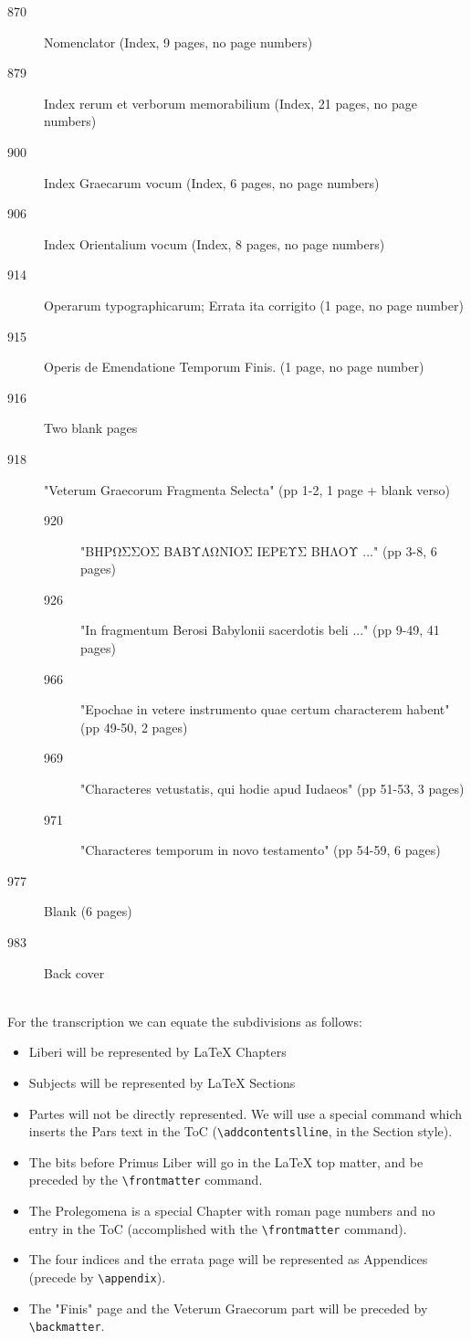 \documentclass{report}
\begin{document}
\begin{description}
\item[870] Nomenclator (Index,  9 pages, no page numbers)
\item[879] Index rerum et verborum memorabilium
 (Index, 21 pages, no page numbers)
\item[900] Index Graecarum vocum (Index, 6 pages, no page numbers)
\item[906] Index Orientalium vocum (Index,  8 pages, no page numbers)
\item[914] Operarum typographicarum; Errata ita corrigito
 (1 page, no page number)
\item[915] Operis de Emendatione Temporum Finis. (1 page, no page number)
\item[916] Two blank pages
\item[918] "Veterum Graecorum Fragmenta Selecta" (pp 1-2, 1 page + blank verso)
\begin{description}
  \item[920] "ΒΗΡΩΣΣΟΣ ΒΑΒΥΛΩΝΙΟΣ ΙΕΡΕΥΣ ΒΗΛΟΥ ..."
     (pp 3-8, 6 pages)
  \item[926] "In fragmentum Berosi Babylonii sacerdotis beli ..."
     (pp 9-49, 41 pages)
  \item[966] "Epochae in vetere instrumento quae certum characterem habent"
     (pp 49-50, 2 pages)
  \item[969] "Characteres vetustatis, qui hodie apud Iudaeos"
     (pp 51-53, 3 pages)
  \item[971] "Characteres temporum in novo testamento"
     (pp 54-59, 6 pages)
\end{description}
\item[977] Blank (6 pages)
\item[983] Back cover
\end{description}
~
\\
For the transcription we can equate the subdivisions as follows:
\begin{itemize}
\item Liberi will be represented by LaTeX Chapters
\item Subjects will be represented by LaTeX Sections
\item Partes will not be directly represented. We will use a special command
 which inserts the Pars text in the ToC
 (\verb+\addcontentslline+, in the Section style).
\item The bits before Primus Liber will go in the LaTeX top matter, and be
 preceded by the \verb+\frontmatter+ command.
\item The Prolegomena is a special Chapter with roman page numbers and
 no entry in the ToC (accomplished with the \verb+\frontmatter+ command).
\item The four indices and the errata page will be represented as Appendices
 (precede by \verb+\appendix+).
\item The "Finis" page and the Veterum Graecorum part will be preceded by
 \verb+\backmatter+.
\end{itemize}
\end{document}
